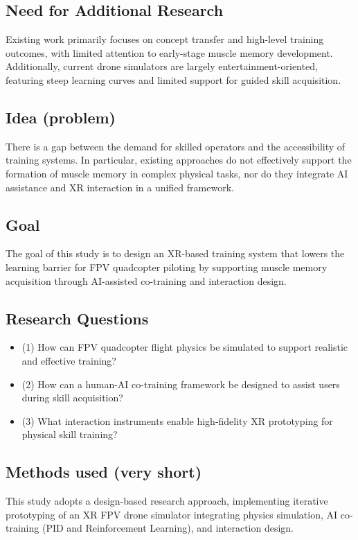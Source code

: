 \subsection{Need for Additional Research}
Existing work primarily focuses on concept transfer and high-level training outcomes, with limited attention to early-stage muscle memory development. Additionally, current drone simulators are largely entertainment-oriented, featuring steep learning curves and limited support for guided skill acquisition.

\subsection{Idea (problem)}
There is a gap between the demand for skilled operators and the accessibility of training systems. In particular, existing approaches do not effectively support the formation of muscle memory in complex physical tasks, nor do they integrate AI assistance and XR interaction in a unified framework.

\subsection{Goal}
The goal of this study is to design an XR-based training system that lowers the learning barrier for FPV quadcopter piloting by supporting muscle memory acquisition through AI-assisted co-training and interaction design.

\subsection{Research Questions}
\begin{itemize}
    \item (1) How can FPV quadcopter flight physics be simulated to support realistic and effective training?
    \item (2) How can a human-AI co-training framework be designed to assist users during skill acquisition?
    \item (3) What interaction instruments enable high-fidelity XR prototyping for physical skill training?
\end{itemize}

\subsection{Methods used (very short)}
This study adopts a design-based research approach, implementing iterative prototyping of an XR FPV drone simulator integrating physics simulation, AI co-training (PID and Reinforcement Learning), and interaction design.